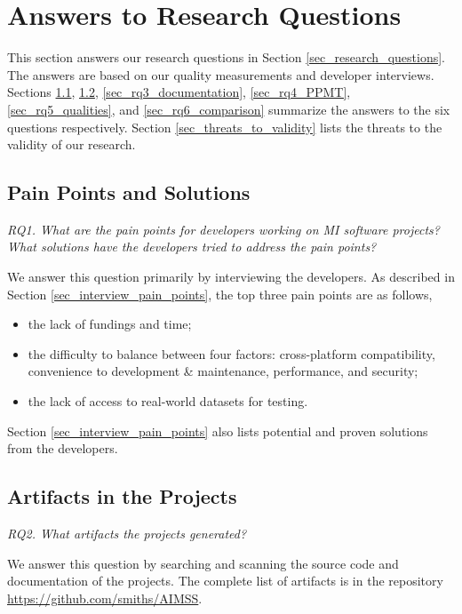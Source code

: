 \chapter{Answers to Research Questions}
\label{ch_answers}

This section answers our research questions in Section \ref{sec_research_questions}. The answers are based on our quality measurements and developer interviews. Sections \ref{sec_rq1_pain_points}, \ref{sec_rq2_artifacts}, \ref{sec_rq3_documentation}, \ref{sec_rq4_PPMT}, \ref{sec_rq5_qualities}, and \ref{sec_rq6_comparison} summarize the answers to the six questions respectively. Section \ref{sec_threats_to_validity} lists the threats to the validity of our research.

\section{Pain Points and Solutions}
\label{sec_rq1_pain_points}
\textit{RQ1. What are the pain points for developers working on MI software projects? What solutions have the developers tried to address the pain points?}

We answer this question primarily by interviewing the developers. As described in Section \ref{sec_interview_pain_points}, the top three pain points are as follows,
\begin{itemize}
\item the lack of fundings and time;
\item the difficulty to balance between four factors: cross-platform compatibility, convenience to development \& maintenance, performance, and security;
\item the lack of access to real-world datasets for testing.
\end{itemize}

Section \ref{sec_interview_pain_points} also lists potential and proven solutions from the developers.

\section{Artifacts in the Projects}
\label{sec_rq2_artifacts}
\textit{RQ2. What artifacts the projects generated?}

We answer this question by searching and scanning the source code and documentation of the projects. The complete list of artifacts is in the repository \hyperlink{https://github.com/smiths/AIMSS}{https://github.com/smiths/AIMSS}.

